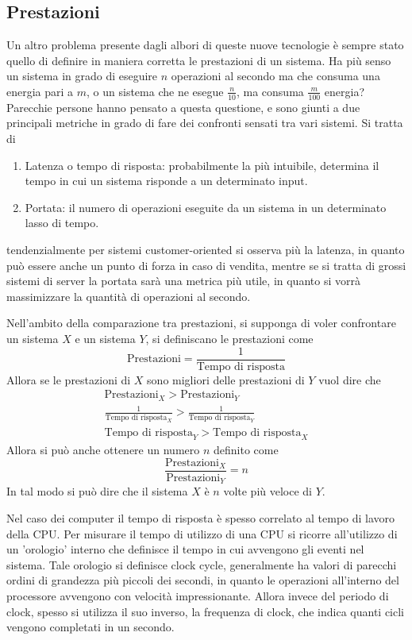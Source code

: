 \documentclass[a4paper,12pt]{article}
\theoremstyle{break}
\numberwithin{equation}{section}
\begin{document}
\subsection{Prestazioni}
Un altro problema presente dagli albori di queste nuove tecnologie è sempre stato quello di definire in maniera corretta le prestazioni di un sistema. Ha più senso un sistema in grado di eseguire \(n\) operazioni al secondo ma che consuma una energia pari a \(m\), o un sistema che ne esegue \(\frac{n}{10}\), ma consuma \(\frac{m}{100}\) energia? Parecchie persone hanno pensato a questa questione, e sono giunti a due principali metriche in grado di fare dei confronti sensati tra vari sistemi.
Si tratta di 
\begin{enumerate}
    \item Latenza o tempo di risposta: probabilmente la più intuibile, determina il tempo in cui un sistema risponde a un determinato input.
    \item Portata: il numero di operazioni eseguite da un sistema in un determinato lasso di tempo.
\end{enumerate}
tendenzialmente per sistemi customer-oriented si osserva più la latenza, in quanto può essere anche un punto di forza in caso di vendita, mentre se si tratta di grossi sistemi di server la portata sarà una metrica più utile, in quanto si vorrà massimizzare la quantità di operazioni al secondo.


Nell'ambito della comparazione tra prestazioni, si supponga di voler confrontare un sistema \(X\) e un sistema \(Y\), si definiscano le prestazioni come 
\[
    \mbox{Prestazioni} = \frac{1}{\mbox{Tempo di risposta}}
\]
Allora se le prestazioni di \(X\) sono migliori delle prestazioni di \(Y\) vuol dire che 
\begin{gather*}
    \mbox{Prestazioni}_X > \mbox{Prestazioni}_Y \\
    \frac{1}{\mbox{Tempo di risposta}_X} > \frac{1}{\mbox{Tempo di risposta}_Y} \\
    \mbox{Tempo di risposta}_Y > \mbox{Tempo di risposta}_X
\end{gather*}
Allora si può anche ottenere un numero \(n\) definito come 
\[
    \frac{\mbox{Prestazioni}_X}{\mbox{Prestazioni}_Y} = n
\]
In tal modo si può dire che il sistema \(X\) è \(n\) volte più veloce di \(Y\). 


Nel caso dei computer il tempo di risposta è spesso correlato al tempo di lavoro della CPU. Per misurare il tempo di utilizzo di una CPU si ricorre all'utilizzo di un 'orologio' interno che definisce il tempo in cui avvengono gli eventi nel sistema. Tale orologio si definisce clock cycle, generalmente ha valori di parecchi ordini di grandezza più piccoli dei secondi, in quanto le operazioni all'interno del processore avvengono con velocità impressionante. Allora invece del periodo di clock, spesso si utilizza il suo inverso, la frequenza di clock, che indica quanti cicli vengono completati in un secondo. 
\end{document}
